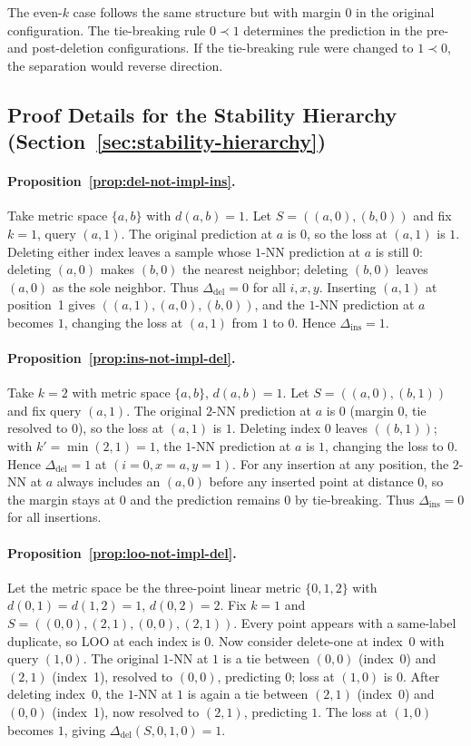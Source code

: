 The even-$k$ case follows the same structure but with margin $0$ in the
original configuration. The tie-breaking rule $0 \prec 1$ determines the
prediction in the pre- and post-deletion configurations. If the tie-breaking
rule were changed to $1 \prec 0$, the separation would reverse direction.

\subsection{Proof Details for the Stability Hierarchy (Section~\ref{sec:stability-hierarchy})}

\paragraph{Proposition~\ref{prop:del-not-impl-ins}.}
Take metric space $\{a, b\}$ with $d(a,b) = 1$. Let $S = ((a,0), (b,0))$ and
fix $k=1$, query $(a,1)$. The original prediction at $a$ is $0$, so the loss at
$(a,1)$ is $1$. Deleting either index leaves a sample whose $1$-NN prediction
at $a$ is still $0$: deleting $(a,0)$ makes $(b,0)$ the nearest neighbor;
deleting $(b,0)$ leaves $(a,0)$ as the sole neighbor. Thus $\Delta_{\mathrm{del}} = 0$ for all $i,x,y$. Inserting $(a,1)$ at position~1 gives
$((a,1), (a,0), (b,0))$, and the $1$-NN prediction at $a$ becomes $1$, changing
the loss at $(a,1)$ from $1$ to $0$. Hence $\Delta_{\mathrm{ins}} = 1$.

\paragraph{Proposition~\ref{prop:ins-not-impl-del}.}
Take $k=2$ with metric space $\{a,b\}$, $d(a,b)=1$. Let $S = ((a,0), (b,1))$
and fix query $(a,1)$. The original $2$-NN prediction at $a$ is $0$ (margin $0$,
tie resolved to $0$), so the loss at $(a,1)$ is $1$. Deleting index $0$ leaves
$((b,1))$; with $k'=\min(2,1)=1$, the $1$-NN prediction at $a$ is $1$, changing
the loss to $0$. Hence $\Delta_{\mathrm{del}} = 1$ at $(i=0,x=a,y=1)$. For any
insertion at any position, the $2$-NN at $a$ always includes an $(a,0)$ before
any inserted point at distance $0$, so the margin stays at $0$ and the prediction
remains $0$ by tie-breaking. Thus $\Delta_{\mathrm{ins}} = 0$ for all insertions.

\paragraph{Proposition~\ref{prop:loo-not-impl-del}.}
Let the metric space be the three-point linear metric $\{0,1,2\}$ with
$d(0,1)=d(1,2)=1$, $d(0,2)=2$. Fix $k=1$ and
$S = ((0,0), (2,1), (0,0), (2,1))$. Every point appears with a same-label
duplicate, so LOO at each index is $0$. Now consider delete-one at index~0 with
query $(1,0)$. The original $1$-NN at $1$ is a tie between $(0,0)$ (index~0) and
$(2,1)$ (index~1), resolved to $(0,0)$, predicting $0$; loss at $(1,0)$ is $0$.
After deleting index~0, the $1$-NN at $1$ is again a tie between $(2,1)$
(index~0) and $(0,0)$ (index~1), now resolved to $(2,1)$, predicting $1$. The
loss at $(1,0)$ becomes $1$, giving $\Delta_{\mathrm{del}}(S,0,1,0)=1$.

